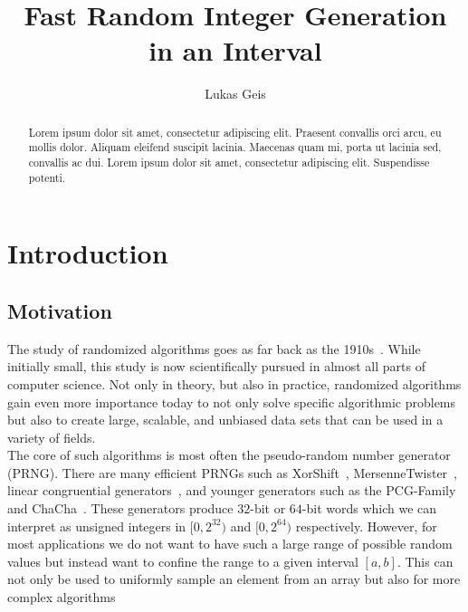 \documentclass[a4paper, UKenglish, cleveref, autoref, thm-restate]{lipics-v2021}
\title{Fast Random Integer Generation in an Interval}
\author{Lukas Geis}{Goethe Universität Frankfurt am Main}{s2949316@stud.uni-frankfurt.de}{}{}
\begin{document}
\maketitle


\begin{abstract}
    Lorem ipsum dolor sit amet, consectetur adipiscing elit. Praesent convallis orci arcu, eu mollis dolor. Aliquam eleifend suscipit lacinia. Maecenas quam mi, porta ut lacinia sed, convallis ac dui. Lorem ipsum dolor sit amet, consectetur adipiscing elit. Suspendisse potenti. 
\end{abstract}


\section{Introduction}
\subsection{Motivation}
The study of randomized algorithms goes as far back as the 1910s~\cite{MathComp}.
While initially small, this study is now scientifically pursued in almost all parts of computer science.
Not only in theory, but also in practice, randomized algorithms gain even more importance today to not only solve specific algorithmic problems but also to create large, scalable, and unbiased data sets that can be used in a variety of fields.
\\
The core of such algorithms is most often the pseudo-random number generator (PRNG).
There are many efficient PRNGs such as XorShift~\cite{XS}, MersenneTwister~\cite{MT}, linear congruential generators~\cite{LinConGen, MINSTD, LM}, and younger generators such as the PCG-Family~\cite{PCG} and ChaCha~\cite{Cha}.
These generators produce $32$-bit or $64$-bit words which we can interpret as unsigned integers in $[0,2^{32})$ and $[0,2^{64})$ respectively.
However, for most applications we do not want to have such a large range of possible random values but instead want to confine the range to a given interval $[a,b]$.
This can not only be used to uniformly sample an element from an array but also for more complex algorithms
\end{document}

